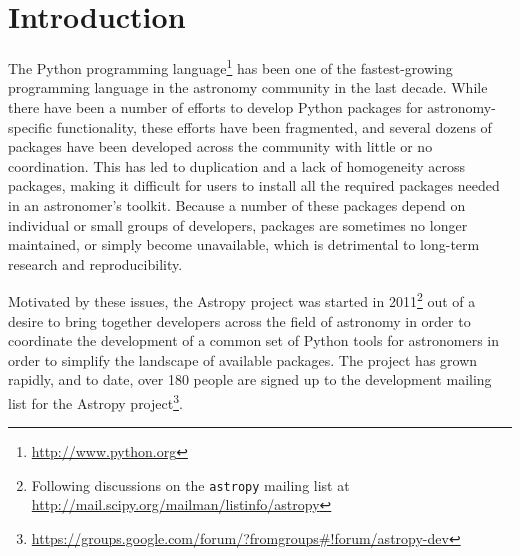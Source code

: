 \documentclass[traditabstract]{aa}
\begin{document}

\maketitle


\section{Introduction}


The Python programming language\footnote{\url{http://www.python.org}} has been
one of the fastest-growing programming language in the astronomy community in
the last decade. While there have been a number of efforts to develop Python
packages for astronomy-specific functionality, these efforts have been
fragmented, and several dozens of packages have been developed across the
community with little or no coordination. This has led to duplication and a
lack of homogeneity across packages, making it difficult for users to install
all the required packages needed in an astronomer's toolkit. Because a number
of these packages depend on individual or small groups of developers, packages
are sometimes no longer maintained, or simply become unavailable, which is
detrimental to long-term research and reproducibility.

Motivated by these issues, the Astropy project was started in
2011\footnote{Following discussions on the \texttt{astropy} mailing list at
\url{http://mail.scipy.org/mailman/listinfo/astropy}} out of a desire to bring
together developers across the field of astronomy in order to coordinate the
development of a common set of Python tools for astronomers in order to
simplify the landscape of available packages. The project has grown rapidly,
and to date, over 180 people are signed up to the development mailing list for
the Astropy project\footnote{
\url{https://groups.google.com/forum/?fromgroups#!forum/astropy-dev}}.
\end{document}
